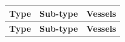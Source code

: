 
\begin{longtable}{l|l|l}
\hline \multicolumn{1}{|c|}{\textbf{Type}} & \multicolumn{1}{c|}{\textbf{Sub-type}} & \multicolumn{1}{c|}{\textbf{Vessels}} \\ \hline 
\endfirsthead

\hline \multicolumn{1}{|c|}{\textbf{Type}} &
\multicolumn{1}{c|}{\textbf{Sub-type}} &
\multicolumn{1}{c|}{\textbf{Vessels}} \\ \hline 
\endhead


\end{longtable}
